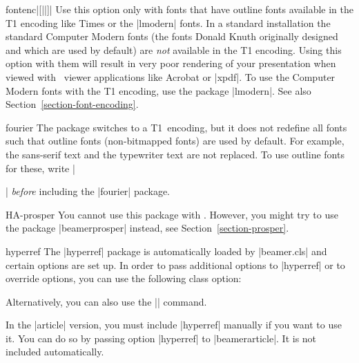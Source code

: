 \begin{package}{{fontenc}|[||]|}
  Use this option only with fonts that have outline fonts available in the T1 encoding like Times or the |lmodern| fonts. In a standard installation the standard Computer Modern fonts (the fonts Donald Knuth originally designed and which are used by default) are \emph{not} available in the T1 encoding. Using this option with them will result in very poor rendering of your presentation when viewed with \pdf\ viewer applications like Acrobat or |xpdf|. To use the Computer Modern fonts with the T1 encoding, use the package |lmodern|. See also Section~\ref{section-font-encoding}.
\end{package}

\begin{package}{{fourier}}
  The package switches to a T1~encoding, but it does not redefine all fonts such that outline fonts (non-bitmapped fonts) are used by default. For example, the sans-serif text and the typewriter text are not replaced. To use outline fonts for these, write |\usepackage{lmodern}| \emph{before} including the |fourier| package.
\end{package}

\begin{package}{{HA-prosper}}
  You cannot use this package with \beamer. However, you might try to use the package |beamerprosper| instead, see Section~\ref{section-prosper}.
\end{package}

\begin{package}{{hyperref}}
  \beamernote
  The |hyperref| package is automatically loaded by |beamer.cls| and certain options are set up. In order to pass additional options to |hyperref| or to override options, you can use the following class option:


  Alternatively, you can also use the |\hypersetup| command.

  \articlenote
  In the |article| version, you must include |hyperref| manually if you want to use it. You can do so by passing option |hyperref| to |beamerarticle|. It is not included automatically.
\end{package}

